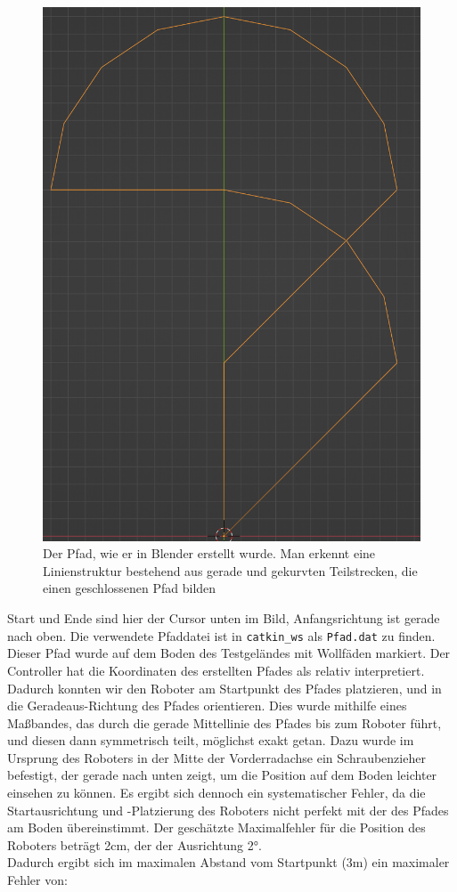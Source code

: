 \documentclass[11pt,a4paper]{article}
\begin{document}
\begin{figure}[ht]
\centering
\includegraphics[scale = 0.6]{pfadgrafik.png}
\caption{Der Pfad, wie er in Blender erstellt wurde. Man erkennt eine Linienstruktur bestehend aus gerade und gekurvten Teilstrecken, die einen geschlossenen Pfad bilden}
\label{fig: MessungExperiment}
\end{figure}

Start und Ende sind hier der Cursor unten im Bild, Anfangsrichtung ist gerade nach oben. Die verwendete Pfaddatei ist in \verb+catkin_ws+ als 
\verb+Pfad.dat+ zu finden.
Dieser Pfad wurde auf dem Boden des Testgeländes mit Wollfäden markiert. Der Controller hat die Koordinaten des erstellten Pfades 
als relativ interpretiert. Dadurch konnten wir den Roboter am Startpunkt des Pfades platzieren, und in die Geradeaus-Richtung des Pfades orientieren. 
Dies wurde mithilfe eines Maßbandes, das durch die gerade Mittellinie des Pfades bis zum Roboter führt, und diesen dann symmetrisch teilt, möglichst exakt getan. 
Dazu wurde im Ursprung des Roboters in der Mitte der Vorderradachse ein Schraubenzieher befestigt, der gerade nach unten zeigt, um die Position auf dem 
Boden leichter einsehen zu können. Es ergibt sich dennoch ein systematischer Fehler, da die Startausrichtung und -Platzierung des Roboters nicht perfekt 
mit der des Pfades am Boden übereinstimmt. Der geschätzte Maximalfehler für die Position des Roboters beträgt 2cm, der der Ausrichtung 2°. 
\\Dadurch ergibt sich im maximalen Abstand vom Startpunkt (3m) ein maximaler Fehler von: \vspace*{-2mm}
\end{document}
